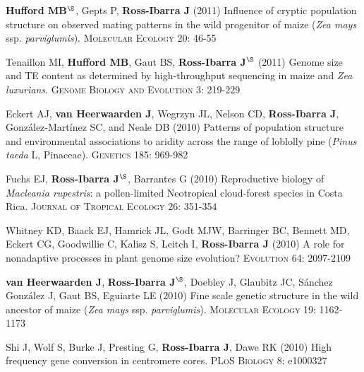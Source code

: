 \documentclass[letterpaper]{article}
\begin{document}
\begin{etaremune}
\vspace{-2ex}
\item {\bf Hufford MB}$^\S$, Gepts P, {\bf Ross-Ibarra J} (2011) Influence of cryptic population structure on observed mating patterns in the wild progenitor of maize (\emph{Zea mays} ssp. \emph{parviglumis}).  \textsc{Molecular Ecology} 20: 46-55

\vspace{-2ex}
\item Tenaillon MI, {\bf Hufford MB}, Gaut BS, {\bf Ross-Ibarra J}$^\S$ (2011)  Genome size and TE content as determined by high-throughput sequencing in maize and \emph{Zea luxurians}.  \textsc{Genome Biology and Evolution } 3: 219-229

\vspace{-2ex}
\item Eckert AJ, {\bf van Heerwaarden J}, Wegrzyn JL, Nelson CD, {\bf Ross-Ibarra J}, Gonz\'{a}lez-Mart\'{i}nez SC, and Neale DB (2010) Patterns of population structure and environmental associations to aridity across the range of loblolly pine (\emph{Pinus taeda} L, Pinaceae).  \textsc{Genetics} 185: 969-982

\vspace{-2ex}
\item Fuchs EJ, {\bf Ross-Ibarra J}$^\S$, Barrantes G (2010) Reproductive biology of \emph{Macleania rupestris}: a pollen-limited Neotropical cloud-forest species in Costa Rica.  \textsc{Journal of Tropical Ecology} 26: 351-354

\vspace{-2ex}
\item Whitney KD, Baack EJ, Hamrick JL, Godt MJW, Barringer BC, Bennett MD, Eckert CG, Goodwillie C, Kalisz S, Leitch I, {\bf Ross-Ibarra J} (2010) A role for nonadaptive processes in plant genome size evolution?  \textsc{Evolution} 64: 2097-2109

\vspace{-2ex}
\item {\bf van Heerwaarden J}, {\bf Ross-Ibarra J}$^\S$, Doebley J, Glaubitz JC, S\'{a}nchez Gonz\'{a}lez J, Gaut BS, Eguiarte LE (2010) Fine scale genetic structure in the wild ancestor of maize (\emph{Zea mays} ssp. \emph{parviglumis}).  \textsc{Molecular Ecology} 19: 1162-1173

\vspace{-2ex}
\item Shi J, Wolf S, Burke J, Presting G, {\bf Ross-Ibarra J}, Dawe RK (2010) High frequency gene conversion in centromere cores.  \textsc{PLoS Biology} 8: e1000327


\end{etaremune}
\end{document}
